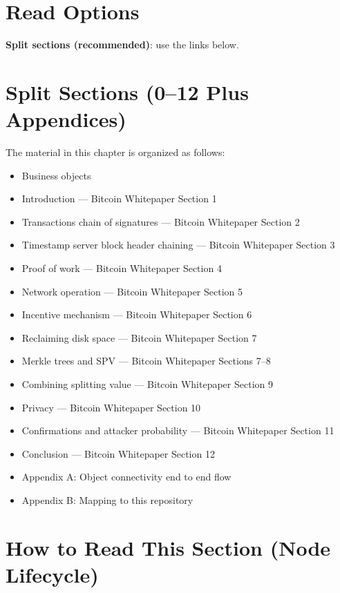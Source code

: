 \section{Read Options}
\label{sec:read-options}

\textbf{Split sections (recommended)}: use the links below.

\section{Split Sections (0--12 Plus Appendices)}
\label{sec:split-sections}

The material in this chapter is organized as follows:

\begin{itemize}
  \item Business objects
  \item Introduction --- Bitcoin Whitepaper Section 1
  \item Transactions chain of signatures --- Bitcoin Whitepaper Section 2
  \item Timestamp server block header chaining --- Bitcoin Whitepaper Section 3
  \item Proof of work --- Bitcoin Whitepaper Section 4
  \item Network operation --- Bitcoin Whitepaper Section 5
  \item Incentive mechanism --- Bitcoin Whitepaper Section 6
  \item Reclaiming disk space --- Bitcoin Whitepaper Section 7
  \item Merkle trees and SPV --- Bitcoin Whitepaper Sections 7--8
  \item Combining splitting value --- Bitcoin Whitepaper Section 9
  \item Privacy --- Bitcoin Whitepaper Section 10
  \item Confirmations and attacker probability --- Bitcoin Whitepaper Section 11
  \item Conclusion --- Bitcoin Whitepaper Section 12
  \item Appendix A: Object connectivity end to end flow
  \item Appendix B: Mapping to this repository
\end{itemize}

\section{How to Read This Section (Node Lifecycle)}
\label{sec:node-lifecycle}

